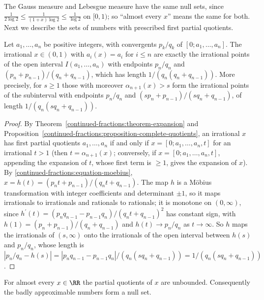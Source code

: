 The Gauss measure and Lebesgue measure have the same null sets, since $\frac{1}{2\log 2} \leq \frac{1}{(1 + x)\log 2} \leq \frac{1}{\log 2}$ on $[0, 1)$; so ``almost every $x$'' means the same for
both. Next we describe the sets of numbers with prescribed first partial quotients.

\begin{proposition}\label{continued-fractions:proposition-cylinders}
Let $a_1, \ldots, a_n$ be positive integers, with convergents $p_k/q_k$ of $[0; a_1, \ldots, a_n]$. The irrational $x \in (0, 1)$ with $a_i(x) = a_i$ for $i \leq n$ are exactly the irrational points of the
open interval $I(a_1, \ldots, a_n)$ with endpoints $p_n/q_n$ and $(p_n + p_{n-1})/(q_n + q_{n-1})$, which has length $1/(q_n(q_n + q_{n-1}))$. More precisely, for $s \geq 1$ those with moreover
$\alpha_{n+1}(x) > s$ form the irrational points of the subinterval with endpoints $p_n/q_n$ and $(sp_n + p_{n-1})/(sq_n + q_{n-1})$, of length $1/(q_n(sq_n + q_{n-1}))$.
\end{proposition}

\begin{proof}
By Theorem~\ref{continued-fractions:theorem-expansion} and Proposition~\ref{continued-fractions:proposition-complete-quotients}, an irrational $x$ has first partial quotients $a_1, \ldots, a_n$ if and only if
$x = [0; a_1, \ldots, a_n, t]$ for an irrational $t > 1$ (then $t = \alpha_{n+1}(x)$; conversely, if $x = [0; a_1, \ldots, a_n, t]$, appending the expansion of $t$, whose first term is $\geq 1$, gives
the expansion of $x$). By \eqref{continued-fractions:equation-moebius}, $x = h(t) = (p_nt + p_{n-1})/(q_nt + q_{n-1})$. The map $h$ is a Möbius transformation with integer coefficients and determinant
$\pm 1$, so it maps irrationals to irrationals and rationals to rationals; it is monotone on $(0, \infty)$, since $h^{\prime}(t) = (p_nq_{n-1} - p_{n-1}q_n)/(q_nt + q_{n-1})^2$ has constant sign, with
$h(1) = (p_n + p_{n-1})/(q_n + q_{n-1})$ and $h(t) \to p_n/q_n$ as $t \to \infty$. So $h$ maps the irrationals of $(s, \infty)$ onto the irrationals of the open interval between $h(s)$ and $p_n/q_n$, whose
length is $|p_n/q_n - h(s)| = |p_nq_{n-1} - p_{n-1}q_n|/(q_n(sq_n + q_{n-1})) = 1/(q_n(sq_n + q_{n-1}))$.
\end{proof}

\begin{theorem}\label{continued-fractions:theorem-unbounded}
For almost every $x \in \RR$ the partial quotients of $x$ are unbounded. Consequently the badly approximable numbers form a null set.
\end{theorem}

